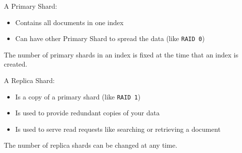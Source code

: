\documentclass[]{beamer}
\begin{document}
\begin{frame}{\subsecname{}}
  \begin{definition}
    A Primary Shard:
    \begin{itemize}
      \item Contains all documents in one index
      \item Can have other Primary Shard to spread the data (like \texttt{RAID 0})
    \end{itemize}
    The number of primary shards in an index is fixed at the time that an index is created.
  \end{definition}

  \begin{definition}
    A Replica Shard:
    \begin{itemize}
      \item Is a copy of a primary shard (like \texttt{RAID 1})
      \item Is used to provide redundant copies of your data
      \item Is used to serve read requests like searching or retrieving a document
    \end{itemize}
    The number of replica shards can be changed at any time.
  \end{definition}
\end{frame}
\end{document}
